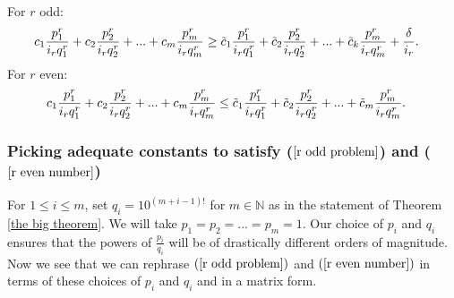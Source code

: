 \documentclass[12pt]{article}
\begin{document}
\noindent For $r$ odd:
\begin{align}
\label{r odd problem}
     &c_1 \frac{p_1^r}{i_r q_1^r} + c_2 \frac{p_2^r}{i_r q_2^r} + ... + c_m  \frac{p_m^r}{i_r q_m^r}
    \geq
    \Tilde{c}_1 \frac{p_1^r}{i_r q_1^r} + \Tilde{c}_2 \frac{p_2^r}{i_r q_2^r} + ... + \Tilde{c}_k  \frac{p_m^r}{i_r q_m^r}+ \frac{\delta}{i_r}.
    \end{align}
    For $r$ even:
    \begin{align}
\label{r even number}
     &c_1 \frac{p_1^r}{i_r q_1^r} + c_2 \frac{p_2^r}{i_r q_2^r} + ... + c_m  \frac{p_m^r}{i_r q_m^r}
    \leq
    \Tilde{c}_1 \frac{p_1^r}{i_r q_1^r} + \Tilde{c}_2 \frac{p_2^r}{i_r q_2^r} + ... + \Tilde{c}_m  \frac{p_m^r}{i_r q_m^r}.
\end{align}



\subsubsection{Picking adequate constants to satisfy (\texorpdfstring{$\ref{r odd problem}$}{r odd problem}) and (\texorpdfstring{$\ref{r even number}$}{r even number}) }
    For $1 \leq i \leq m$, set $q_i=10^{(m+i-1)!}$ for $m \in \mathbb{N}$ as in the statement of Theorem \ref{the big theorem}. We will take $p_1=p_2=...=p_m=1$. Our choice of $p_i$ and $q_i$ ensures that the powers of $\frac{p_i}{q_i}$ will be of drastically different orders of magnitude. Now we see that we can rephrase $(\ref{r odd problem})$ and $(\ref{r even number})$ in terms of these choices of $p_i$ and $q_i$ and in a matrix form.
\end{document}
